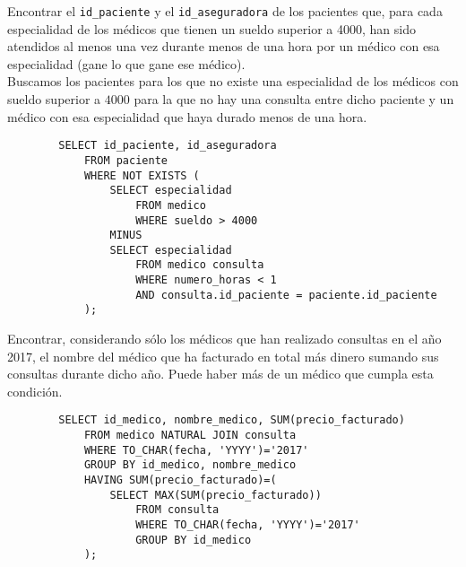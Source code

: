 \documentclass[12pt]{article}
\begin{document}
\begin{ejercicio}[SQL]
    Encontrar el \verb|id_paciente| y el \verb|id_aseguradora| de los pacientes que, para cada especialidad de los médicos que tienen un sueldo superior a 4000, han sido atendidos al menos una vez durante menos de una hora por un médico con esa especialidad (gane lo que gane ese médico).\\

    Buscamos los pacientes para los que no existe una especialidad de los médicos con sueldo superior a $4000$ para la que no hay una consulta entre dicho paciente y un médico con esa especialidad que haya durado menos de una hora.
    \begin{verbatim}
        SELECT id_paciente, id_aseguradora
            FROM paciente
            WHERE NOT EXISTS (
                SELECT especialidad
                    FROM medico
                    WHERE sueldo > 4000
                MINUS
                SELECT especialidad
                    FROM medico consulta
                    WHERE numero_horas < 1
                    AND consulta.id_paciente = paciente.id_paciente
            );
    \end{verbatim}
\end{ejercicio}

\begin{ejercicio}[SQL]
    Encontrar, considerando sólo los médicos que han realizado consultas en el año 2017, el nombre del médico que ha facturado en total más dinero sumando sus consultas durante dicho año. Puede haber más de un médico que cumpla esta condición.
    \begin{verbatim}
        SELECT id_medico, nombre_medico, SUM(precio_facturado)
            FROM medico NATURAL JOIN consulta
            WHERE TO_CHAR(fecha, 'YYYY')='2017'
            GROUP BY id_medico, nombre_medico
            HAVING SUM(precio_facturado)=(
                SELECT MAX(SUM(precio_facturado))
                    FROM consulta
                    WHERE TO_CHAR(fecha, 'YYYY')='2017'
                    GROUP BY id_medico
            );
    \end{verbatim}
\end{ejercicio}
\end{document}
